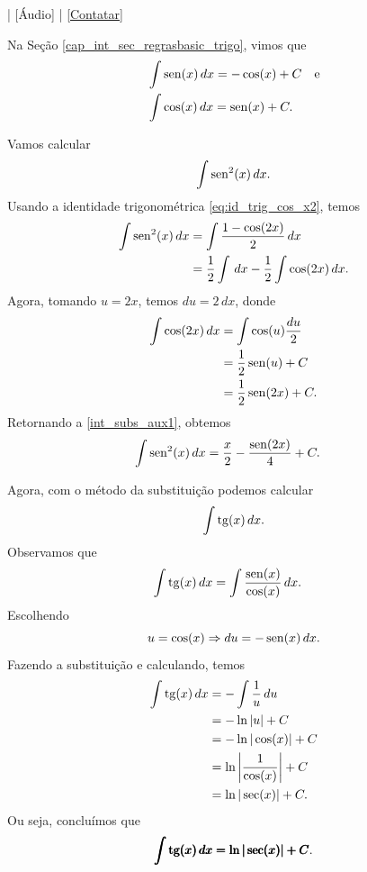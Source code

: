 \begin{flushright}
  [Vídeo] | [Áudio] | \href{https://phkonzen.github.io/notas/contato.html}{[Contatar]}
\end{flushright}

Na Seção \ref{cap_int_sec_regrasbasic_trigo}, vimos que
\begin{align}
  &\int \operatorname{sen}(x)\,dx = -\cos(x) + C \quad\text{e}\\
  &\int \cos(x)\,dx = \operatorname{sen}(x) + C.
\end{align}

\begin{ex}
  Vamos calcular
  \begin{equation}
    \int \operatorname{sen}^2(x)\,dx.
  \end{equation}
  Usando a identidade trigonométrica \ref{eq:id_trig_cos_x2}, temos
  \begin{align}
    \int \operatorname{sen}^2(x)\,dx &= \int \frac{1-\cos(2x)}{2}\,dx \\
                       &= \frac{1}{2}\int\,dx - \frac{1}{2}\int\cos(2x)\,dx.\label{int_subs_aux1}
  \end{align}
  Agora, tomando $u = 2x$, temos $du = 2\,dx$, donde
  \begin{align}
    \int \cos(2x)\,dx &= \int\cos(u)\frac{du}{2} \\
                      &= \frac{1}{2}\operatorname{sen}(u) + C \\
                      &= \frac{1}{2}\operatorname{sen}(2x) + C.
  \end{align}
  Retornando a \ref{int_subs_aux1}, obtemos
  \begin{align}
    \int \operatorname{sen}^2(x)\,dx &= \frac{x}{2} - \frac{\operatorname{sen}(2x)}{4} + C.
  \end{align}
\end{ex}

Agora, com o método da substituição podemos calcular
\begin{equation}
  \int \operatorname{tg}(x)\,dx.
\end{equation}
Observamos que
\begin{align}
  \int \operatorname{tg}(x)\,dx &= \int \frac{\operatorname{sen}(x)}{\cos(x)}\,dx.
\end{align}
Escolhendo
\begin{equation}
  u = \cos(x) \Rightarrow du = -\operatorname{sen}(x)\,dx.
\end{equation}
Fazendo a substituição e calculando, temos
\begin{align}
  \int \operatorname{tg}(x)\,dx &= -\int \frac{1}{u}\,du \\
                  &= -\ln|u| + C \\
                  &= -\ln|\cos(x)| + C \\
                  &= \ln\left|\frac{1}{\cos(x)}\right| + C\\
                  &= \ln|\sec(x)| + C.
\end{align}
Ou seja, concluímos que
\begin{equation}
  \pmb{\int\operatorname{tg}(x)\,dx = \ln|\sec(x)| + C}.
\end{equation}

